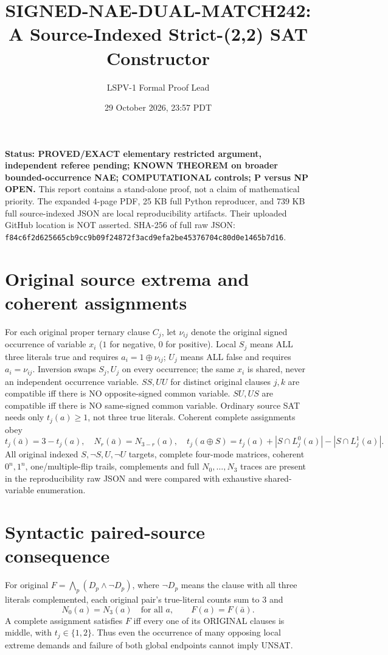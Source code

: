 \documentclass[10pt]{article}
\title{SIGNED-NAE-DUAL-MATCH242: A Source-Indexed Strict-(2,2) SAT Constructor}
\author{LSPV-1 Formal Proof Lead}
\date{29 October 2026, 23:57 PDT}
\begin{document}
\maketitle
\noindent \textbf{Status: PROVED/EXACT elementary restricted argument, independent referee pending; KNOWN THEOREM on broader bounded-occurrence NAE; COMPUTATIONAL controls; P versus NP OPEN.} This report contains a stand-alone proof, not a claim of mathematical priority. The expanded 4-page PDF, 25 KB full Python reproducer, and 739 KB full source-indexed JSON are local reproducibility artifacts. Their uploaded GitHub location is NOT asserted. SHA-256 of full raw JSON: \texttt{f84c6f2d625665cb9cc9b09f24872f3acd9efa2be45376704c80d0e1465b7d16}.
\section{Original source extrema and coherent assignments}
For each original proper ternary clause $C_j$, let $\nu_{ij}$ denote the original signed occurrence of variable $x_i$ ($1$ for negative, $0$ for positive). Local $S_j$ means ALL three literals true and requires $a_i=1\oplus\nu_{ij}$; $U_j$ means ALL false and requires $a_i=\nu_{ij}$. Inversion swaps $S_j,U_j$ on every occurrence; the same $x_i$ is shared, never an independent occurrence variable. $SS,UU$ for distinct original clauses $j,k$ are compatible iff there is NO opposite-signed common variable. $SU,US$ are compatible iff there is NO same-signed common variable. Ordinary source SAT needs only $t_j(a)\ge1$, not three true literals. Coherent complete assignments obey
\[
t_j(\bar a)=3-t_j(a),\quad N_r(\bar a)=N_{3-r}(a),\quad
t_j(a\oplus S)=t_j(a)+|S\cap L^0_j(a)|-|S\cap L^1_j(a)|.
\]
All original indexed $S,\neg S,U,\neg U$ targets, complete four-mode matrices, coherent $0^n,1^n$, one/multiple-flip trails, complements and full $N_0,\dots,N_3$ traces are present in the reproducibility raw JSON and were compared with exhaustive shared-variable enumeration.
\section{Syntactic paired-source consequence}
For original $F=\bigwedge_p (D_p\land\neg D_p)$, where $\neg D_p$ means the clause with all three literals complemented, each original pair's true-literal counts sum to $3$ and
\[
N_0(a)=N_3(a)\quad\text{for all }a,\qquad F(a)=F(\bar a).
\]
A complete assignment satisfies $F$ iff every one of its ORIGINAL clauses is middle, with $t_j\in\{1,2\}$. Thus even the occurrence of many opposing local extreme demands and failure of both global endpoints cannot imply UNSAT.
\end{document}
